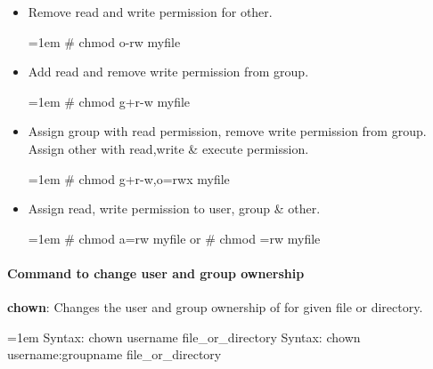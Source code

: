 \begin{flushleft}
\begin{itemize}
	\item Remove read and write permission for other.
	\begin{tcolorbox}[breakable,notitle,boxrule=-0pt,colback=black,colframe=black]
		\color{green}
		\font=1em
		\# chmod o-rw myfile
		\font=4pt
	\end{tcolorbox}
	\bigskip

	\item Add read and remove write permission from group.
	\begin{tcolorbox}[breakable,notitle,boxrule=-0pt,colback=black,colframe=black]
		\color{green}
		\font=1em
		\# chmod g+r-w myfile
		\font=4pt
	\end{tcolorbox}
	\bigskip

	\item Assign group with read permission, remove write permission from group. Assign other with read,write \& execute permission.
	\begin{tcolorbox}[breakable,notitle,boxrule=-0pt,colback=black,colframe=black]
		\color{green}
		\font=1em
		\# chmod g+r-w,o=rwx myfile
		\font=4pt
	\end{tcolorbox}
	\bigskip

	\item Assign read, write permission to user, group \& other.
	\begin{tcolorbox}[breakable,notitle,boxrule=-0pt,colback=black,colframe=black]
		\color{green}
		\font=1em
		\# chmod a=rw myfile
		\newline
		or
		\newline
		\# chmod =rw myfile
		\font=4pt
	\end{tcolorbox}

\end{itemize}

\newpage

\paragraph{Command to change user and group ownership}
\bigskip
\textbf{chown}: Changes the user and group ownership of for given file or directory.

\begin{tcolorbox}[breakable,notitle,boxrule=0pt,colback=pink,colframe=pink]
	\color{black}
	\font=1em
	Syntax: chown username file\_or\_directory
	\newline
	Syntax: chown username:groupname file\_or\_directory
	\font=4pt
\end{tcolorbox}


\end{flushleft}
